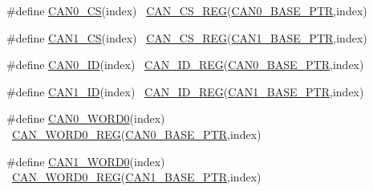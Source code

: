 \begin{DoxyCompactItemize}
\#define \hyperlink{group___c_a_n___register___accessor___macros_ga9d24c3b8ca55fb014f477c4a586fe9d6}{C\+A\+N0\+\_\+\+CS}(index)                                                  ~\hyperlink{group___c_a_n___register___accessor___macros_gac99a637d119cf05e14250a1465275522}{C\+A\+N\+\_\+\+C\+S\+\_\+\+R\+EG}(\hyperlink{group___c_a_n___peripheral_ga1ee8f499e10af9b8e3132e0168e519b9}{C\+A\+N0\+\_\+\+B\+A\+S\+E\+\_\+\+P\+TR},index)
\item 
\#define \hyperlink{group___c_a_n___register___accessor___macros_ga70afb0e5509292d14467ead72cc74e03}{C\+A\+N1\+\_\+\+CS}(index)                                                  ~\hyperlink{group___c_a_n___register___accessor___macros_gac99a637d119cf05e14250a1465275522}{C\+A\+N\+\_\+\+C\+S\+\_\+\+R\+EG}(\hyperlink{group___c_a_n___peripheral_ga810387eeeb9ccd0e09ae057ff6f0d2ca}{C\+A\+N1\+\_\+\+B\+A\+S\+E\+\_\+\+P\+TR},index)
\item 
\#define \hyperlink{group___c_a_n___register___accessor___macros_gac7b043c2201389dfe416e3f5166db6cc}{C\+A\+N0\+\_\+\+ID}(index)                                                  ~\hyperlink{group___c_a_n___register___accessor___macros_ga081389bb65f5ba1945fa2984d057044e}{C\+A\+N\+\_\+\+I\+D\+\_\+\+R\+EG}(\hyperlink{group___c_a_n___peripheral_ga1ee8f499e10af9b8e3132e0168e519b9}{C\+A\+N0\+\_\+\+B\+A\+S\+E\+\_\+\+P\+TR},index)
\item 
\#define \hyperlink{group___c_a_n___register___accessor___macros_ga6363290fa493350368cf139282eb1489}{C\+A\+N1\+\_\+\+ID}(index)                                                  ~\hyperlink{group___c_a_n___register___accessor___macros_ga081389bb65f5ba1945fa2984d057044e}{C\+A\+N\+\_\+\+I\+D\+\_\+\+R\+EG}(\hyperlink{group___c_a_n___peripheral_ga810387eeeb9ccd0e09ae057ff6f0d2ca}{C\+A\+N1\+\_\+\+B\+A\+S\+E\+\_\+\+P\+TR},index)
\item 
\#define \hyperlink{group___c_a_n___register___accessor___macros_gaa0a859ba1ce74eaa3d818f7f3c33b81c}{C\+A\+N0\+\_\+\+W\+O\+R\+D0}(index)                                            ~\hyperlink{group___c_a_n___register___accessor___macros_gab486ab7c313c1c3ab3ea1d146a4e4597}{C\+A\+N\+\_\+\+W\+O\+R\+D0\+\_\+\+R\+EG}(\hyperlink{group___c_a_n___peripheral_ga1ee8f499e10af9b8e3132e0168e519b9}{C\+A\+N0\+\_\+\+B\+A\+S\+E\+\_\+\+P\+TR},index)
\item 
\#define \hyperlink{group___c_a_n___register___accessor___macros_ga9a7f7bb1b6d0ccc063894f333aa70177}{C\+A\+N1\+\_\+\+W\+O\+R\+D0}(index)                                            ~\hyperlink{group___c_a_n___register___accessor___macros_gab486ab7c313c1c3ab3ea1d146a4e4597}{C\+A\+N\+\_\+\+W\+O\+R\+D0\+\_\+\+R\+EG}(\hyperlink{group___c_a_n___peripheral_ga810387eeeb9ccd0e09ae057ff6f0d2ca}{C\+A\+N1\+\_\+\+B\+A\+S\+E\+\_\+\+P\+TR},index)

\end{DoxyCompactItemize}
